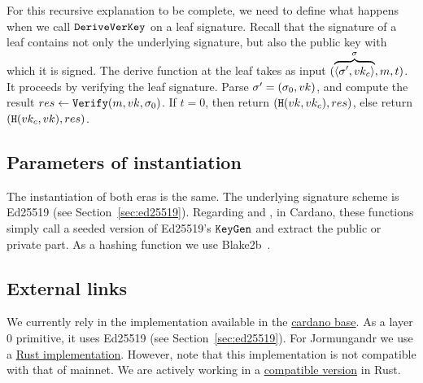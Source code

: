 For this recursive explanation to be complete, we need to define what happens when we call $\texttt{DeriveVerKey}$ on a leaf
signature. Recall that the signature of a leaf contains not only the underlying signature, but also the public key
with which it is signed. The derive function at the leaf takes as input
$(\overbrace{\langle\sigma', vk_c\rangle}^{\sigma}, m, t)$. It proceeds by verifying the leaf signature.
Parse $\sigma' = (\sigma_0, vk)$, and compute the result $res\gets\texttt{Verify}(m, vk, \sigma_0)$. If $t = 0$, then
return $(\texttt{H}(vk, vk_c), res)$, else return $(\texttt{H}(vk_c, vk), res)$.

\subsection{Parameters of instantiation}
\label{sec:kes:params}
The instantiation of both eras is the same. The underlying signature scheme is Ed25519 (see Section~\ref{sec:ed25519}).
Regarding \pkeygen and \skeygen, in Cardano,
these functions simply call a seeded version of Ed25519's $\texttt{KeyGen}$ and extract the public or private part. As a hashing
function we use Blake2b~\cite{blake2b}.
\subsection{External links}
We currently rely in the implementation available in the \href{https://github
.com/input-output-hk/cardano-base/tree/master/cardano-crypto-class/src/Cardano/Crypto/KES}{cardano base}. As a layer
0 primitive, it uses Ed25519 (see Section~\ref{sec:ed25519}). For Jormungandr we use a \href{https://github
.com/input-output-hk/chain-libs/tree/master/chain-crypto/src/algorithms/sumed25519}{Rust implementation}. However,
note that this implementation is not compatible with that of mainnet. We are actively working in a
\href{https://github.com/input-output-hk/kes-mmm-sumed25519/tree/crate_review}{compatible version} in Rust.

